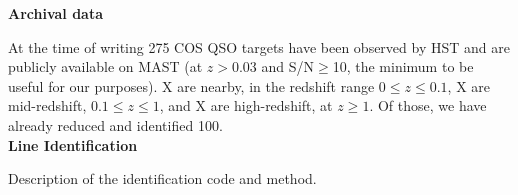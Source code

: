 \documentclass[12pt]{article}
\begin{document}



\noindent \textbf{Archival data}


At the time of writing 275 COS QSO targets have been observed by HST and are publicly available on MAST  (at $z > 0.03$ and S/N$\geq$10, the minimum to be useful for our purposes). X are nearby, in the redshift range $0\leq z \leq 0.1$, X are mid-redshift, $0.1\leq z \leq 1$, and X are high-redshift, at $z \geq 1$. Of those, we have already reduced and identified 100.\\



\noindent \textbf{Line Identification}

Description of the identification code and method.\\
\end{document}
